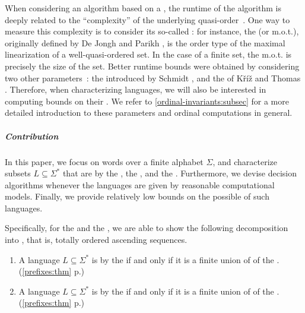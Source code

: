 \AP When considering an algorithm based on a , the
runtime of the algorithm is deeply related to the ``complexity'' of the
underlying quasi-order~\cite{SCHMITZ17}. One way to measure this complexity is
to consider its so-called : for instance, the
 (or m.o.t.), originally defined by De Jongh and Parikh
\cite{dejongh77}, is the order type of the maximal linearization of a
well-quasi-ordered set. In the case of a finite set, the m.o.t. is precisely
the size of the set. Better runtime bounds were obtained by considering two
other parameters~\cite{SCHMITZ19}: the  introduced by
Schmidt \cite{schmidt81}, and the  of Kříž and Thomas
\cite{kriz90b}. Therefore, when characterizing 
languages, we will also be interested in computing bounds on their . We refer to \cref{ordinal-invariants:subsec}
for a more detailed introduction to these
parameters and ordinal computations in general.

\subparagraph{Contribution} In this paper, we focus on words over a finite
alphabet $\Sigma$, and characterize subsets $L \subseteq \Sigma^*$ that are
 by the , the ,
and the . Furthermore, we devise decision algorithms
whenever the languages are given by reasonable computational models. Finally,
we provide relatively low bounds on the possible  of
such languages.

Specifically, for the  and the
, we are able to show the following decomposition into
, that is, totally ordered ascending sequences.

{
\renewcommand{\labelenumi}{R\arabic{enumi}}
\begin{enumerate}
	\item A language $L \subseteq \Sigma^*$ is  by the  if and only if it is a finite union of  of the .
    \hfill (\cref{prefixes:thm} p.\pageref{prefixes:thm})
	\item A language $L \subseteq \Sigma^*$ is  by the  if and only if it is a finite union of  of the .
    \hfill (\cref{prefixes:thm} p.\pageref{prefixes:thm})
\end{enumerate}
}

